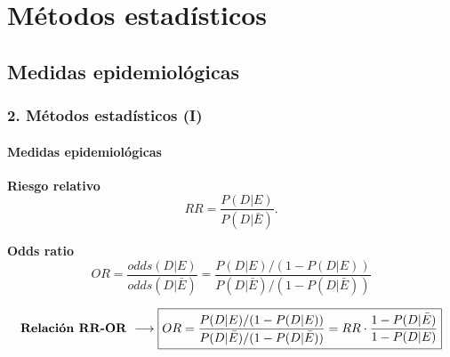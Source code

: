 \documentclass{beamer}
\begin{document}
\section{Métodos estadísticos}

\subsection{Medidas epidemiológicas}
\begin{frame}
\frametitle{2. Métodos estadísticos (I)}
\framesubtitle{Medidas epidemiológicas}

	\begin{block}{\textbf{Riesgo relativo}}
		\small
		$$RR=\frac{P(D|E)}{P(D|\bar{E})}.$$
		\normalsize
	\end{block}
		\begin{block}{\textbf{Odds ratio}}
		\small
		$$OR=\frac{odds(D|E)}{odds(D|\bar{E})}=\frac{P(D|E)/(1-P(D|E))}{P(D|\bar{E})/(1-P(D|\bar{E}))}$$
		\normalsize
		\end{block}
\vspace{0.2cm}
\small
\begin{equation*}
\text{\textbf{Relación RR-OR}    } \longrightarrow \boxed{OR=\frac{P(D|E)/(1-P(D|E))}{P(D|\bar{E})/(1-P(D|\bar{E}))}=RR \cdot \frac{1-P(D|\bar{E})}{1-P(D|E)}}
\end{equation*}
\normalsize
\end{frame}

\end{document}
